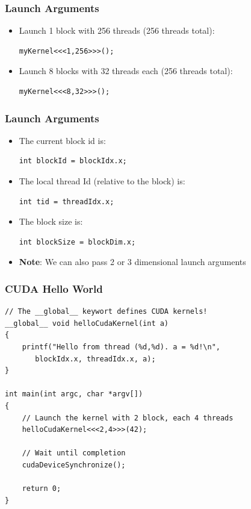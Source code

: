 \documentclass[aspectratio=169]{beamer}
\begin{document}
\begin{frame}[fragile]
	\frametitle{Launch Arguments}
	\begin{itemize}
		\item Launch 1 block with 256 threads (256 threads total):
\begin{lstlisting}
myKernel<<<1,256>>>();
\end{lstlisting}
		\item Launch 8 blocks with 32 threads each (256 threads total):
\begin{lstlisting}
myKernel<<<8,32>>>();
\end{lstlisting}
	\end{itemize}
\end{frame}



\begin{frame}[fragile]
\frametitle{Launch Arguments}

\begin{itemize}
	\item The current block id is:
\begin{lstlisting}
int blockId = blockIdx.x;
\end{lstlisting}
	\item The local thread Id (relative to the block) is:
\begin{lstlisting}
int tid = threadIdx.x;
\end{lstlisting}
	\item The block size is:
\begin{lstlisting}
int blockSize = blockDim.x;
\end{lstlisting}	
	\item \textbf{Note}: We can also pass 2 or 3 dimensional launch arguments
\end{itemize}
\end{frame}


\begin{frame}[fragile]
\frametitle{CUDA Hello World}
\begin{lstlisting}
// The __global__ keywort defines CUDA kernels!
__global__ void helloCudaKernel(int a)
{
	printf("Hello from thread (%d,%d). a = %d!\n", 
	   blockIdx.x, threadIdx.x, a);
}

int main(int argc, char *argv[])
{
	// Launch the kernel with 2 block, each 4 threads
	helloCudaKernel<<<2,4>>>(42);
	
	// Wait until completion
	cudaDeviceSynchronize();
	
	return 0;
}
\end{lstlisting}
\end{frame}
\end{document}
